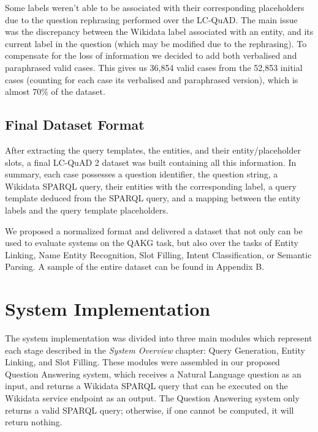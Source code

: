 Some labels weren’t able to be associated with their corresponding placeholders due to the 
question rephrasing performed over the LC-QuAD. The main issue was the discrepancy between the 
Wikidata label associated with an entity, and its current label in the question (which may be 
modified due to the rephrasing). To compensate for the loss of information we decided to add 
both verbalised and paraphrased valid cases. This gives us 36,854 valid cases from the 52,853 
initial cases (counting for each case its verbalised and paraphrased version), which is almost 
70\% of the dataset.

\subsection{Final Dataset Format}
\label{cap4:experimentalDesign/QaDataset/finalFormat}
After extracting the query templates, the entities, and their entity/placeholder slots, a final 
LC-QuAD 2 dataset was built containing all this information. In summary, each case possesses a 
question identifier, the question string, a Wikidata SPARQL query, their entities with the 
corresponding label, a query template deduced from the SPARQL query, and a mapping between the 
entity labels and the query template placeholders. 

We proposed a normalized format and delivered a dataset that not only can be used to evaluate 
systems on the QAKG task, but also over the tasks of Entity Linking, Name Entity Recognition, 
Slot Filling, Intent Classification, or Semantic Parsing. A sample of the entire dataset can be 
found in Appendix B.

\section{System Implementation}
\label{cap4:experimentalDesign/systemImplementation}
The system implementation was divided into three main modules which represent each stage 
described in the \textit{System Overview} chapter: Query Generation, Entity Linking, and Slot 
Filling. These modules were assembled in our proposed Question Answering system, which receives 
a Natural Language question as an input, and returns a Wikidata SPARQL query that can be executed 
on the Wikidata service endpoint as an output. The Question Answering system only returns a valid 
SPARQL query; otherwise, if one cannot be computed, it will return nothing.


